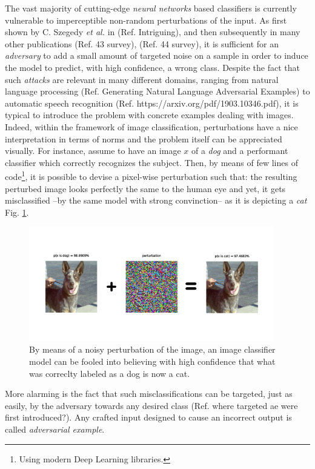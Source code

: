 \documentclass[LaM,binding=0.6cm]{./packages/sapthesis/sapthesis}
\begin{document}
        The vast majority of cutting-edge \textit{neural networks} based classifiers is currently vulnerable to imperceptible non-random perturbations of the input.
        As first shown by C. Szegedy \textit{et al.} in \cite{szegedy2013-intriguing} (Ref. Intriguing), and then subsequently in many other publications (Ref. 43 survey), (Ref. 44 survey),
        it is sufficient for an \textit{adversary} to add a small amount of targeted noise on a sample in order to induce the model to predict, with high confidence,
        a wrong class. Despite the fact that such \textit{attacks} are relevant in many different domains, ranging from natural language processing (Ref. Generating Natural Language Adversarial Examples) to automatic speech recognition (Ref. https://arxiv.org/pdf/1903.10346.pdf), 
        it is typical to introduce the problem with concrete examples dealing with images.
        Indeed, within the framework of image classification, perturbations have a nice interpretation in terms of norms and the problem itself can be appreciated visually.
        For instance, assume to have an image $x$ of a \textit{dog} and a performant classifier which correctly recognizes the subject. Then, by means of few lines of code\footnote{Using modern Deep Learning libraries.},
        it is possible to devise a pixel-wise perturbation such that: the resulting perturbed image looks perfectly the same to the human eye and yet, it gets misclassified --by the same model with strong convinction--
        as it is depicting a \textit{cat} Fig. \ref{fig:aecatdog}.  
        \begin{figure}[!h]
            \centering
            \includegraphics[width=0.95\textwidth]{prt.png}
            \caption{By means of a noisy perturbation of the image, an image classifier model can be fooled into believing with high confidence that what was correclty labeled as a dog is now a cat.}
            \label{fig:aecatdog}
        \end{figure}
        More alarming is the fact that such misclassifications can be targeted, just as easily, by the adversary towards any desired class (Ref. where targeted ae were first introduced?). Any crafted input designed to 
        cause an incorrect output is called \textit{adversarial example}.
\end{document}
